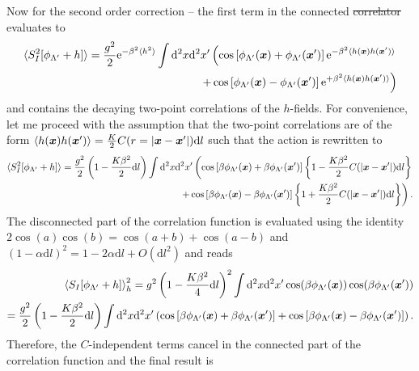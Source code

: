 \documentclass{svmono}
\def\re{\mathrm e}
\def\rd{\mathrm d}
\newcommand{\commutator}[1]{\left[ #1 \right]}
\newcommand{\anticommutator}[1]{\left\{ #1 \right\}}
\newcommand{\brlr}[1]{\left( #1 \right)}
\providecommand{\DIFaddtex}[1]{{\protect\color{blue}\uwave{#1}}} %
\providecommand{\DIFdeltex}[1]{{\protect\color{red}\sout{#1}}}                      %
\providecommand{\DIFaddbegin}{} %
\providecommand{\DIFaddend}{} %
\providecommand{\DIFdelbegin}{} %
\providecommand{\DIFdelend}{} %
\providecommand{\DIFadd}[1]{\texorpdfstring{\DIFaddtex{#1}}{#1}} %
\providecommand{\DIFdel}[1]{\texorpdfstring{\DIFdeltex{#1}}{}} %
\newcommand{\DIFscaledelfig}{0.5}
\newlength{\DIFdelgraphicswidth} %
\newlength{\DIFdelgraphicsheight} %
\newcommand{\DIFaddincludegraphics}[2][]{{\color{blue}\fbox{\DIFOincludegraphics[#1]{#2}}}} %
\newcommand{\DIFdelincludegraphics}[2][]{%
\sbox{\DIFdelgraphicsbox}{\DIFOincludegraphics[#1]{#2}}%
\settoboxwidth{\DIFdelgraphicswidth}{\DIFdelgraphicsbox} %
\settoboxtotalheight{\DIFdelgraphicsheight}{\DIFdelgraphicsbox} %
\scalebox{\DIFscaledelfig}{%
\parbox[b]{\DIFdelgraphicswidth}{\usebox{\DIFdelgraphicsbox}\\[-\baselineskip] \rule{\DIFdelgraphicswidth}{0em}}\llap{\resizebox{\DIFdelgraphicswidth}{\DIFdelgraphicsheight}{%
\setlength{\unitlength}{\DIFdelgraphicswidth}%
\begin{picture}(1,1)%
\thicklines\linethickness{2pt} %
{\color[rgb]{1,0,0}\put(0,0){\framebox(1,1){}}}%
{\color[rgb]{1,0,0}\put(0,0){\line( 1,1){1}}}%
{\color[rgb]{1,0,0}\put(0,1){\line(1,-1){1}}}%
\end{picture}%
}\hspace*{3pt}}} %
} %
\DeclareRobustCommand{\DIFaddbegin}{\DIFOaddbegin \let\includegraphics\DIFaddincludegraphics} %
\DeclareRobustCommand{\DIFaddend}{\DIFOaddend \let\includegraphics\DIFOincludegraphics} %
\DeclareRobustCommand{\DIFdelbegin}{\DIFOdelbegin \let\includegraphics\DIFdelincludegraphics} %
\DeclareRobustCommand{\DIFdelend}{\DIFOaddend \let\includegraphics\DIFOincludegraphics} %
\begin{document}
Now for the second order correction -- the first term in the connected \DIFdelbegin \DIFdel{correlator }\DIFdelend \DIFaddbegin \DIFadd{correlation function }\DIFaddend evaluates to
\begin{align}
    \braket{S^2_I[\phi_{\Lambda'}+h]}=\frac{g^2}2\re^{-\beta^2\braket{h^2}}\int\rd^2x\rd^2x'
    \left(
        \cos\commutator{\phi_{\Lambda'}({\bm x})+\phi_{\Lambda'}({\bm x'})}\re^{-\beta^2\braket{h({\bm x})h({\bm x'})}}
        \right.\\
        \left.+
        \cos\commutator{\phi_{\Lambda'}({\bm x})-\phi_{\Lambda'}({\bm x'})}\re^{+\beta^2\braket{h({\bm x})h({\bm x'})}}
    \right)
    \label{eq:second_order_rg_term1}
\end{align}
and contains the decaying two-point correlations of the $h$-fields.
For convenience, let me proceed with the assumption that the two-point correlations are of the form $\braket{h({\bm x})h({\bm x'})} = \frac K2 C(r=|{\bm x}-{\bm x'}|)\rd l$ such that the action is rewritten to
\DIFaddbegin {\small
\DIFaddend \begin{align}
    \braket{S^2_I[\phi_{\Lambda'}+h]}=\frac{g^2}2\brlr{1 - \frac{K\beta^2}2\rd l}\int\rd^2x\rd^2x'
    \left(
        \cos\commutator{\beta\phi_{\Lambda'}({\bm x})+\beta\phi_{\Lambda'}({\bm x'})}\anticommutator{1-\frac{K\beta^2}2C(|{\bm x}-{\bm x'}|)\rd l}
        \right.\\
        \left.+
        \cos\commutator{\beta\phi_{\Lambda'}({\bm x})-\beta\phi_{\Lambda'}({\bm x'})}\anticommutator{1+\frac{K\beta^2}2C(|{\bm x}-{\bm x'}|)\rd l}
    \right).
\end{align}
\DIFaddbegin }\DIFaddend The disconnected part of the correlation function is evaluated using the identity $2\cos(a)\cos(b)=\cos(a+b)+\cos(a-b)$ and $(1-\alpha\rd l)^2 = 1-2\alpha\rd l + O(\rd l^2)$ and reads
\begin{align}
    \braket{S_I[\phi_{\Lambda'}+h]}_h^2
    = g^2\brlr{1 - \frac{K\beta^2}4\rd l}^2\int\rd^2x\rd^2x'\cos(\beta \phi_{\Lambda'}({\bm x}))\cos(\beta \phi_{\Lambda'}({\bm x'}))
    \\
    = \frac{g^2}2\brlr{1 - \frac{K\beta^2}2\rd l}\int\rd^2x\rd^2x'
        \left(
            \cos\commutator{\beta \phi_{\Lambda'}({\bm x})+\beta \phi_{\Lambda'}({\bm x'})}
            +
            \cos\commutator{\beta \phi_{\Lambda'}({\bm x})-\beta \phi_{\Lambda'}({\bm x'})}
        \right).
\end{align}
Therefore, the $C$-independent terms cancel in the connected part of the correlation function and the final result is
\end{document}
